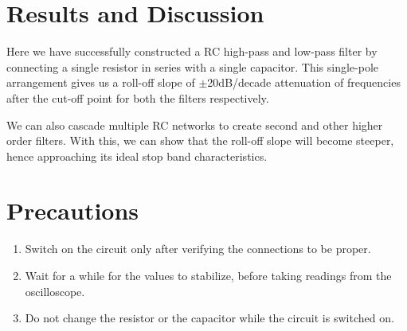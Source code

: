\section{Results and Discussion}
Here we have successfully constructed a RC high-pass and low-pass filter by connecting a single resistor in series with a single capacitor. This single-pole arrangement gives us a roll-off slope of $\pm$20dB/decade attenuation of frequencies after the cut-off point for both the filters respectively.

We can also cascade multiple RC networks to create second and other higher order filters. With this, we can show that the roll-off slope will become steeper, hence approaching its ideal stop band characteristics.

\section{Precautions}
\begin{enumerate}
    \item Switch on the circuit only after verifying the connections to be proper.
    \item Wait for a while for the values to stabilize, before taking readings from the oscilloscope.
    \item Do not change the resistor or the capacitor while the circuit is switched on.
\end{enumerate}